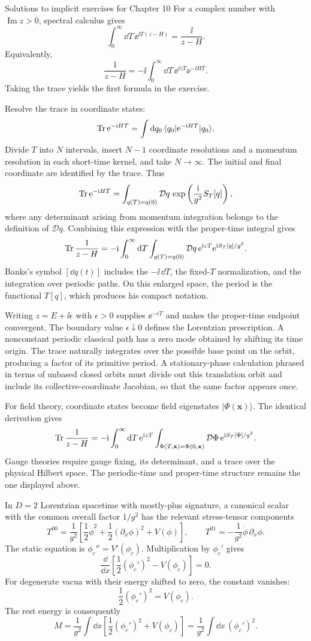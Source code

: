 \begin{bankssolutions}{Solutions to implicit exercises for Chapter 10}
For a complex number with $\operatorname{Im}z>0$, spectral calculus gives
\[
  \int_0^\infty\dd T\,\ee^{\ii T(z-H)}
  =\frac{\ii}{z-H}.
\]
Equivalently,
\[
  \frac1{z-H}=-\ii\int_0^\infty\dd T\,
  \ee^{\ii zT}\ee^{-\ii HT}.
\]
Taking the trace yields the first formula in the exercise.

Resolve the trace in coordinate states:
\[
  \operatorname{Tr}\mathrm{e}^{-\mathrm{i} HT}
  =\int\mathop{}\!\mathrm{d} q_0\,\langle q_0\rvert \mathrm{e}^{-\mathrm{i} HT}\lvert q_0\rangle.
\]
Divide $T$ into $N$ intervals, insert $N-1$ coordinate resolutions and a
momentum resolution in each short-time kernel, and take $N\to\infty$.  The
initial and final coordinate are identified by the trace.  Thus
\[
  \operatorname{Tr}\mathrm{e}^{-\mathrm{i} HT}
  =\int_{q(T)=q(0)}\mathcal Dq\,
  \exp\left(\frac{\mathrm{i}}{g^2}S_T[q]\right),
\]
where any determinant arising from momentum integration belongs to the
definition of $\mathcal Dq$.  Combining this expression with the proper-time
integral gives
\[
  \operatorname{Tr}\frac1{z-H}
  =-\mathrm{i}\int_0^\infty\mathop{}\!\mathrm{d} T
  \int_{q(T)=q(0)}\mathcal Dq\,
  \mathrm{e}^{\mathrm{i} zT}\mathrm{e}^{\mathrm{i} S_T[q]/g^2}.
\]
Banks's symbol $[\dd q(t)]$ includes the $-\ii\,\dd T$, the fixed-$T$
normalization, and the integration over periodic paths.  On this enlarged
space, the period is the functional $T[q]$, which produces his compact
notation.

Writing $z=E+\ii\epsilon$ with $\epsilon>0$ supplies
$\ee^{-\epsilon T}$ and makes the proper-time endpoint convergent.  The
boundary value $\epsilon\downarrow0$ defines the Lorentzian prescription.  A
nonconstant periodic classical path has a zero mode obtained by shifting its
time origin.  The trace naturally integrates over the possible base point on
the orbit, producing a factor of its primitive period.  A stationary-phase
calculation phrased in terms of unbased closed orbits must divide out this
translation orbit and include its collective-coordinate Jacobian, so that the
same factor appears once.

For field theory, coordinate states become field eigenstates
$\lvert\Phi(\mathbf x)\rangle$.  The identical derivation gives
\[
  \operatorname{Tr}\frac1{z-H}
  =-\mathrm{i}\int_0^\infty\mathop{}\!\mathrm{d} T\,\mathrm{e}^{\mathrm{i} zT}
  \int_{\Phi(T,\mathbf x)=\Phi(0,\mathbf x)}
  \mathcal D\Phi\,
  \mathrm{e}^{\mathrm{i} S_T[\Phi]/g^2}.
\]
Gauge theories require gauge fixing, its determinant, and a trace over the
physical Hilbert space.  The periodic-time and proper-time structure remains
the one displayed above.

In $D=2$ Lorentzian spacetime with mostly-plus signature, a canonical scalar
with the common overall factor $1/g^2$ has the relevant stress-tensor
components
\[
  T^{00}=\frac1{g^2}\left[
  \frac12\dot\phi^2+\frac12(\partial_x\phi)^2+V(\phi)\right],
  \qquad
  T^{01}=-\frac1{g^2}\dot\phi\,\partial_x\phi.
\]
The static equation is $\phi_c''=V'(\phi_c)$.  Multiplication by $\phi_c'$
gives
\[
  \frac{\dd}{\dd x}\left[\frac12(\phi_c')^2-V(\phi_c)\right]=0.
\]
For degenerate vacua with their energy shifted to zero, the constant vanishes:
\[
  \frac12(\phi_c')^2=V(\phi_c).
\]
The rest energy is consequently
\[
  M=\frac1{g^2}\int\dd x\left[
  \frac12(\phi_c')^2+V(\phi_c)\right]
  =\frac1{g^2}\int\dd x\,(\phi_c')^2.
\]


\end{bankssolutions}
